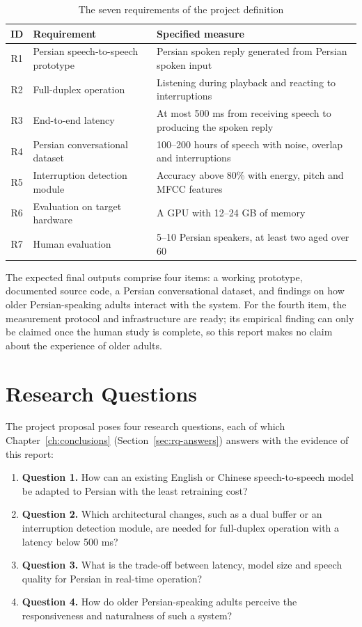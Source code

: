 \begin{table}[ht]
\centering
\caption{The seven requirements of the project definition}
\label{tab:requirements}
\small
\begin{tabular}{clL{6.4cm}}
\toprule
\textbf{ID} & \textbf{Requirement} & \textbf{Specified measure} \\
\midrule
R1 & Persian speech-to-speech prototype & Persian spoken reply generated from
      Persian spoken input \\
R2 & Full-duplex operation & Listening during playback and reacting to
      interruptions \\
R3 & End-to-end latency & At most 500 ms from receiving speech to producing the
      spoken reply \\
R4 & Persian conversational dataset & 100--200 hours of speech with noise,
      overlap and interruptions \\
R5 & Interruption detection module & Accuracy above 80\% with energy, pitch and
      MFCC features \\
R6 & Evaluation on target hardware & A GPU with 12--24 GB of memory \\
R7 & Human evaluation & 5--10 Persian speakers, at least two aged over 60 \\
\bottomrule
\end{tabular}
\end{table}

The expected final outputs comprise four items: a working prototype, documented
source code, a Persian conversational dataset, and findings on how older
Persian-speaking adults interact with the system. For the fourth item, the
measurement protocol and infrastructure are ready; its empirical finding can only
be claimed once the human study is complete, so this report makes no claim about
the experience of older adults.

\section{Research Questions}
\label{sec:rq}

The project proposal poses four research questions, each of which
Chapter~\ref{ch:conclusions} (Section~\ref{sec:rq-answers}) answers with the
evidence of this report:

\begin{enumerate}
\item \textbf{Question 1.} How can an existing English or Chinese speech-to-speech
model be adapted to Persian with the least retraining cost?
\item \textbf{Question 2.} Which architectural changes, such as a dual buffer or
an interruption detection module, are needed for full-duplex operation with a
latency below 500 ms?
\item \textbf{Question 3.} What is the trade-off between latency, model size and
speech quality for Persian in real-time operation?
\item \textbf{Question 4.} How do older Persian-speaking adults perceive the
responsiveness and naturalness of such a system?
\end{enumerate}

